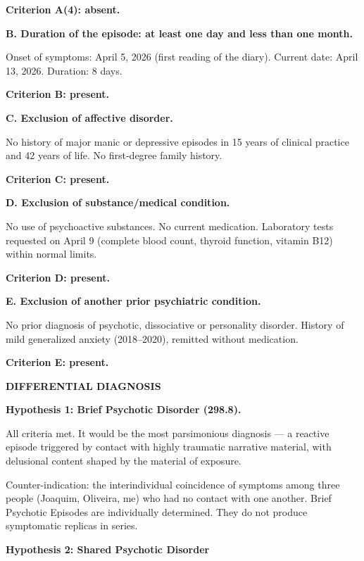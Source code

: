 \noindent \textbf{Criterion A(4): absent.}

\noindent \textbf{B. Duration of the episode: at least one day and less than one month.}

\noindent Onset of symptoms: April 5, 2026 (first reading
\noindent of the diary). Current date: April 13, 2026. Duration: 8 days.

\noindent \textbf{Criterion B: present.}

\noindent \textbf{C. Exclusion of affective disorder.}

\noindent No history of major manic or depressive episodes
\noindent in 15 years of clinical practice and 42 years of life. No
\noindent first-degree family history.

\noindent \textbf{Criterion C: present.}

\noindent \textbf{D. Exclusion of substance/medical condition.}

\noindent No use of psychoactive substances. No current medication.
\noindent Laboratory tests requested on April 9 (complete blood count,
\noindent thyroid function, vitamin B12) within normal limits.

\noindent \textbf{Criterion D: present.}

\noindent \textbf{E. Exclusion of another prior psychiatric condition.}

\noindent No prior diagnosis of psychotic, dissociative or
\noindent personality disorder. History of mild generalized anxiety
\noindent (2018--2020), remitted without medication.

\noindent \textbf{Criterion E: present.}

\noindent \textbf{DIFFERENTIAL DIAGNOSIS}

\noindent \textbf{Hypothesis 1: Brief Psychotic Disorder (298.8).}

\noindent All criteria met. It would be the most parsimonious
\noindent diagnosis --- a reactive episode triggered by contact with
\noindent highly traumatic narrative material, with delusional content
\noindent shaped by the material of exposure.

\noindent Counter-indication: the interindividual coincidence of
\noindent symptoms among three people (Joaquim, Oliveira, me) who had no
\noindent contact with one another. Brief Psychotic Episodes are individually
\noindent determined. They do not produce symptomatic replicas in series.

\textbf{Hypothesis 2: Shared Psychotic Disorder}

